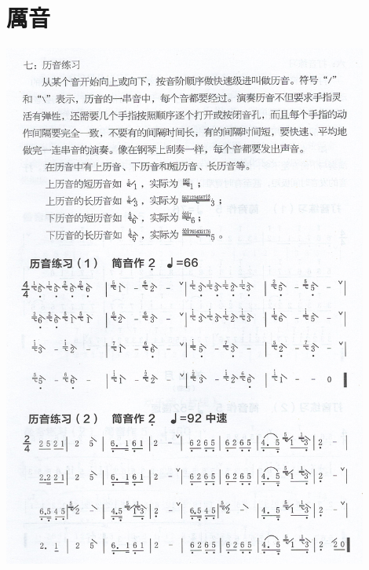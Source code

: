 \documentclass[cn,pad,twocol]{elegantbook}
\begin{document}
\section{厲音}                  \includegraphics[width=0.9\textwidth]{dongxiao/Scan 13.jpeg}
\end{document}
